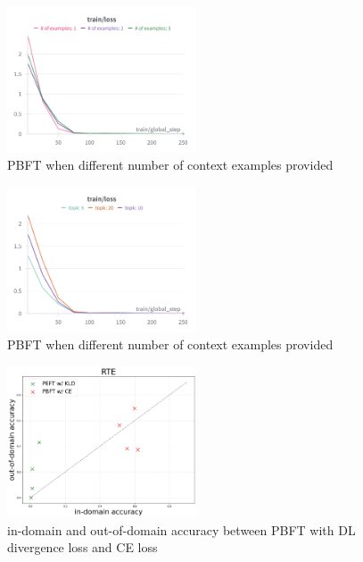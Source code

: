 \documentclass[10pt,twocolumn,letterpaper]{article}
\begin{document}
\begin{figure}[htbp]
   \centering
   \includegraphics[width=0.50\textwidth]{Fig1_comparing number of context examples.png}
   \caption{PBFT when different number of context examples provided}
   \label{fig:your-label}
\end{figure}




\begin{figure}[htbp]
   \centering
   \includegraphics[width=0.50\textwidth]{Fig2_comparing topk.png}
   \caption{PBFT when different number of context examples provided}
   \label{fig:your-label}
\end{figure}



\begin{figure}[htbp]
   \centering
   \includegraphics[width=0.50\textwidth]{Fig4_CE_KLD_comparing_id_ood.png}
   \caption{in-domain and out-of-domain accuracy between PBFT with DL divergence loss and CE loss}
   \label{fig:your-label}
\end{figure}
\end{document}
